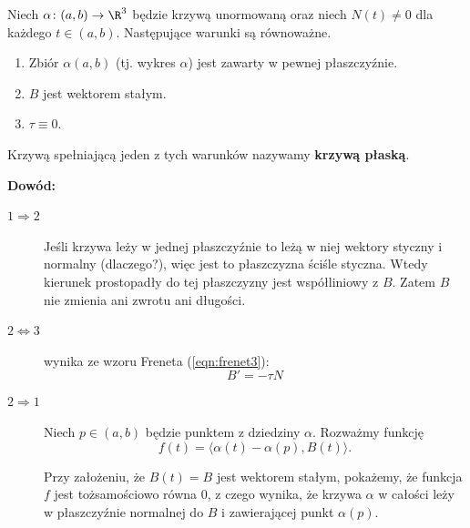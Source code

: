 \begin{frame}[<+->]

\begin{lemat}
Niech $\alpha\colon (a,b)\to \R^3$ będzie krzywą unormowaną oraz niech $N(t)\neq 0$ dla każdego $t\in (a,b)$. Następujące warunki są równoważne.
\begin{enumerate}
\item Zbi\'or $\alpha(a,b)$ (tj. wykres $\alpha$) jest zawarty w pewnej płaszczyźnie.
\item $B$ jest wektorem stałym.
\item $\tau\equiv 0$.
\end{enumerate}

\end{lemat}

\begin{uwaga}
Krzywą spełniającą jeden z tych warunków nazywamy \textbf{krzywą płaską}.
\end{uwaga}

\end{frame}
\begin{frame}

\textcolor{ared}{\textbf{Dowód:}}\pause \\
\begin{description}
\item [$1\Rightarrow 2$] Jeśli krzywa leży w jednej płaszczyźnie to leżą w niej 
wektory styczny i normalny (dlaczego?), \pause więc jest to płaszczyzna ściśle 
styczna. \pause Wtedy kierunek prostopadły do tej płaszczyzny jest współliniowy 
z $B$. Zatem $B$ nie zmienia ani zwrotu ani długości.\pause
\item [$2\Leftrightarrow 3$] wynika ze wzoru Freneta (\ref{eqn:frenet3}):
\[B'=-\tau N\]
\end{description}

\end{frame}
\begin{frame}
\begin{description}
\item [$2\Rightarrow 1$] Niech $p\in (a,b)$ będzie punktem z dziedziny $\alpha$. 
Rozważmy funkcję
\[f(t)=\langle \alpha(t)-\alpha(p),B(t)\rangle.\]


Przy założeniu, że $B(t)=B$ jest wektorem stałym, pokażemy, że funkcja $f$ jest tożsamościowo równa $0$, \pause z czego wynika, że krzywa $\alpha$ w całości leży w płaszczyźnie normalnej do $B$ i zawierającej punkt $\alpha(p)$.
\end{description}
\end{frame}
